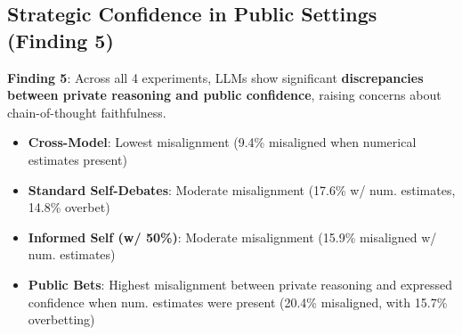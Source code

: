 \documentclass{article}
\begin{document}
\begin{table}[htbp]
  \centering
  \caption{Distribution of Confidence Level Combinations for Both Debaters in the Closing Round, by Experiment Type (n=60 debates per experiment type). Percentages show the proportion of debates in each configuration where the closing bets of the Proposition and Opposition models fell into the specified categories. The 'Both $>$75\%' column represents the core logical inconsistency finding.}
  \label{tab:logical_impossibility}
\end{table}

\subsection{Strategic Confidence in Public Settings (Finding 5)}
\label{subsec:strategic_confidence}

\textbf{Finding 5}: Across all 4 experiments, LLMs show significant \textbf{discrepancies between private reasoning and public confidence}, raising concerns about chain-of-thought faithfulness.

\begin{itemize}
    \item \textbf{Cross-Model}: Lowest misalignment (9.4\% misaligned when numerical estimates present)
    \item \textbf{Standard Self-Debates}: Moderate misalignment (17.6\% w/ num. estimates, 14.8\% overbet)
    \item \textbf{Informed Self (w/ 50\%)}: Moderate misalignment (15.9\% misaligned w/ num. estimates)
    \item \textbf{Public Bets}: Highest misalignment between private reasoning and expressed confidence when num. estimates were present (20.4\% misaligned, with 15.7\% overbetting)
  \end{itemize}
\end{document}
